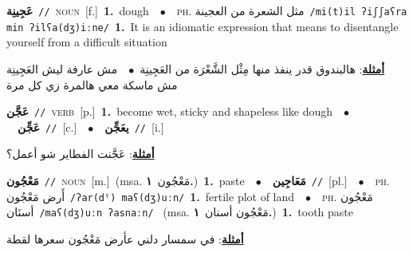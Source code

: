 \documentclass[10pt,a4paper,twoside]{article} %
\begin{document}
\begin{multicols}{2}
{\setlength\topsep{0pt}\textbf{\foreignlanguage{arabic}{عَجِينِة}}\ {\color{gray}\texttt{//}\color{black}}\ \textsc{noun}\ [f.]\ \textbf{1.}~dough\ \ $\bullet$\ \ \textsc{ph.} \color{gray} \foreignlanguage{arabic}{مثل الشعرة من العجينة}\color{black}\ {\color{gray}\texttt{/{\sffamily mi(t)il ʔiʃʃaʕra min ʔilʕa(dʒ)iːne}/}\color{black}}\ \textbf{1.}~It is an idiomatic expression that means to disentangle yourself from a difficult situation\  \begin{flushright}\color{gray}\foreignlanguage{arabic}{\textbf{\underline{\foreignlanguage{arabic}{أمثلة}}}: هالبندوق قدر ينفذ منها مِثْل الشَّعْرَة من العَجِينِة\ $\bullet$\ \  مش عارفة ليش العَجِينِة مش ماسكة معي هالمرة زي كل مرة}\end{flushright}\color{black}} \vspace{2mm}

{\setlength\topsep{0pt}\textbf{\foreignlanguage{arabic}{عَجَّن}}\ {\color{gray}\texttt{//}\color{black}}\ \textsc{verb}\ [p.]\ \textbf{1.}~become wet, sticky and shapeless like dough\ \ $\bullet$\ \ \setlength\topsep{0pt}\textbf{\foreignlanguage{arabic}{عَجِّن}}\ {\color{gray}\texttt{//}\color{black}}\ [c.]\ \ $\bullet$\ \ \setlength\topsep{0pt}\textbf{\foreignlanguage{arabic}{يعَجِّن}}\ {\color{gray}\texttt{//}\color{black}}\ [i.]\  \begin{flushright}\color{gray}\foreignlanguage{arabic}{\textbf{\underline{\foreignlanguage{arabic}{أمثلة}}}: عَجَّنت الفطاير شو أعمل؟}\end{flushright}\color{black}} \vspace{2mm}

{\setlength\topsep{0pt}\textbf{\foreignlanguage{arabic}{مَعْجُون}}\ {\color{gray}\texttt{//}\color{black}}\ \textsc{noun}\ [m.]\ \color{gray}(msa. \foreignlanguage{arabic}{مَعْجُون}~\foreignlanguage{arabic}{\textbf{١.}})\color{black}\ \textbf{1.}~paste\ \ $\bullet$\ \ \setlength\topsep{0pt}\textbf{\foreignlanguage{arabic}{مَعَاجِين}}\ {\color{gray}\texttt{//}\color{black}}\ [pl.]\ \ $\bullet$\ \ \textsc{ph.} \color{gray} \foreignlanguage{arabic}{أَرض مَعْجُون}\color{black}\ {\color{gray}\texttt{/{\sffamily ʔar(dˤ) maʕ(dʒ)uːn}/}\color{black}}\ \textbf{1.}~fertile plot of land\ \ $\bullet$\ \ \textsc{ph.} \color{gray} \foreignlanguage{arabic}{مَعْجُون أسنَان}\color{black}\ {\color{gray}\texttt{/{\sffamily maʕ(dʒ)uːn ʔasnaːn}/}\color{black}}\ \color{gray} (msa. \foreignlanguage{arabic}{مَعْجُون أسنان}~\foreignlanguage{arabic}{\textbf{١.}})\color{black}\ \textbf{1.}~tooth paste\  \begin{flushright}\color{gray}\foreignlanguage{arabic}{\textbf{\underline{\foreignlanguage{arabic}{أمثلة}}}: في سمسار دلني عأرض مَعْجُون سعرها لقطة}\end{flushright}\color{black}} \vspace{2mm}


\end{multicols}
\end{document}
